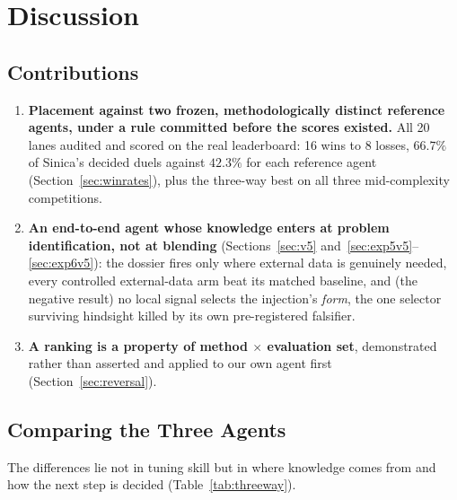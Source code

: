 \documentclass[11pt,a4paper]{article}
\begin{document}
\section{Discussion}

\subsection{Contributions}

\begin{enumerate}[leftmargin=*]
  \item \textbf{Placement against two frozen, methodologically distinct reference agents, under a rule
  committed before the scores existed.} All 20 lanes audited and scored on the real leaderboard:
  16 wins to 8 losses, $66.7\%$ of Sinica's decided duels against $42.3\%$ for each reference agent
  (Section~\ref{sec:winrates}), plus the three-way best on all three mid-complexity competitions.

  \item \textbf{An end-to-end agent whose knowledge enters at problem identification, not at
  blending} (Sections~\ref{sec:v5} and~\ref{sec:exp5v5}--\ref{sec:exp6v5}): the dossier fires
  only where external data is genuinely needed, every controlled external-data arm beat its
  matched baseline, and (the negative result) no local signal selects the injection's
  \emph{form}, the one selector surviving hindsight killed by its own pre-registered falsifier.

  \item \textbf{A ranking is a property of method $\times$ evaluation set}, demonstrated rather
  than asserted and applied to our own agent first (Section~\ref{sec:reversal}).
\end{enumerate}

\subsection{Comparing the Three Agents}

The differences lie not in tuning skill but in where knowledge comes from and how the next step is decided (Table~\ref{tab:threeway}).
\end{document}
